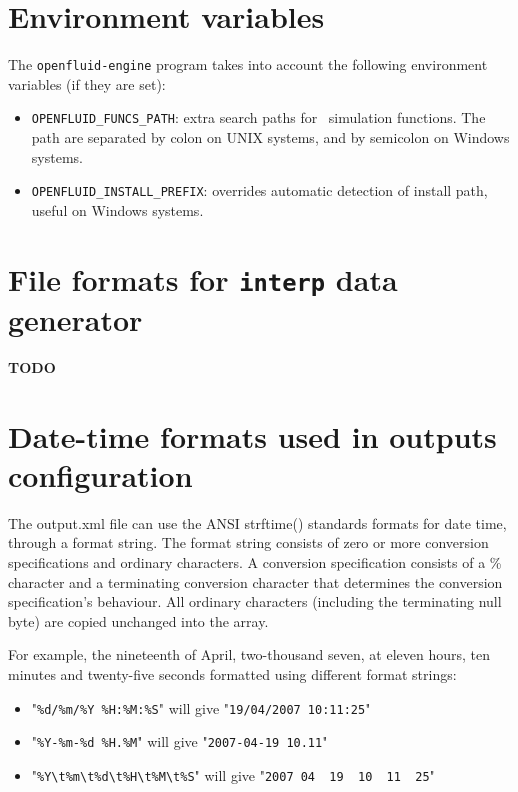 \section{Environment variables}

The \texttt{openfluid-engine} program takes into account the following environment
variables (if they are set):
\begin{itemize}
\item \texttt{OPENFLUID\_FUNCS\_PATH}: extra search paths for \OFEname \ simulation functions. The path are separated by colon on UNIX systems, and by semicolon on Windows systems. 
\item \texttt{OPENFLUID\_INSTALL\_PREFIX}: overrides automatic detection of install path, useful on Windows systems.
\end{itemize}


\section{File formats for \texttt{interp} data generator}

\textbf{TODO}

\section{Date-time formats used in outputs configuration}

The output.xml file can use the ANSI strftime() standards formats for date time, through a format string. 
The format string consists of zero or more conversion specifications and ordinary characters.
A conversion specification consists of a \% character and a terminating conversion character that determines the conversion specification's behaviour.
All ordinary characters (including the terminating null byte) are copied unchanged into the array.

\bigskip

For example, the nineteenth of April, two-thousand seven, at eleven hours, ten minutes and twenty-five seconds formatted using different format strings:
\begin{itemize}
\item "\verb|%d/%m/%Y %H:%M:%S|" will give "\verb|19/04/2007 10:11:25|"
\item "\verb|%Y-%m-%d %H.%M|" will give "\verb|2007-04-19 10.11|"
\item "\verb|%Y\t%m\t%d\t%H\t%M\t%S|" will give "\verb|2007	04	19	10	11	25|"
\end{itemize}

